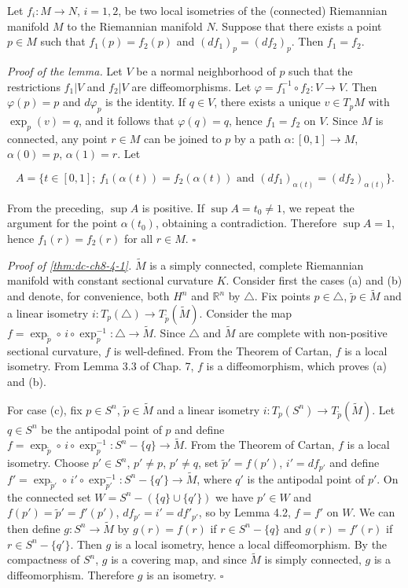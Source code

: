 \begin{lemma}
  \label{lem:dc-ch8-4-2}
  \notready
  Let $f_i:M\to N$, $i=1,2$, be two local isometries of the (connected) Riemannian
  manifold $M$ to the Riemannian manifold $N$. Suppose that there exists a point
  $p\in M$ such that $f_1(p)=f_2(p)$ and $(df_1)_p=(df_2)_p$. Then $f_1=f_2$.
  
  \emph{Proof of the lemma.} Let $V$ be a normal neighborhood of $p$ such that the
  restrictions $f_1|V$ and $f_2|V$ are diffeomorphisms. Let
  $\varphi=f_1^{-1}\circ f_2:V\to V$. Then $\varphi(p)=p$ and $d\varphi_p$ is the
  identity. If $q\in V$, there exists a unique $v\in T_pM$ with $\exp_p(v)=q$, and it
  follows that $\varphi(q)=q$, hence $f_1=f_2$ on $V$. Since $M$ is connected, any
  point $r\in M$ can be joined to $p$ by a path $\alpha:[0,1]\to M$, $\alpha(0)=p$,
  $\alpha(1)=r$. Let
  
  $$
  A=\{t\in[0,1];\ f_1(\alpha(t))=f_2(\alpha(t))\text{ and }(df_1)_{\alpha(t)}=(df_2)_{\alpha(t)}\}.
  $$
  
  From the preceding, $\sup A$ is positive. If $\sup A=t_0\neq 1$, we repeat the
  argument for the point $\alpha(t_0)$, obtaining a contradiction. Therefore
  $\sup A=1$, hence $f_1(r)=f_2(r)$ for all $r\in M$. $\square$
  
  \emph{Proof of \cref{thm:dc-ch8-4-1}.} $\tilde{M}$ is a simply connected, complete Riemannian
  manifold with constant sectional curvature $K$. Consider first the cases (a) and
  (b) and denote, for convenience, both $H^n$ and $\mathbb{R}^n$ by $\triangle$. Fix
  points $p\in\triangle$, $\tilde{p}\in\tilde{M}$ and a linear isometry
  $i:T_p(\triangle)\to T_{\tilde{p}}(\tilde{M})$. Consider the map
  $f=\exp_{\tilde{p}}\circ\,i\circ\exp_p^{-1}:\triangle\to\tilde{M}$. Since $\triangle$
  and $\tilde{M}$ are complete with non-positive sectional curvature, $f$ is
  well-defined. From the Theorem of Cartan, $f$ is a local isometry. From Lemma 3.3
  of Chap. 7, $f$ is a diffeomorphism, which proves (a) and (b).
  
  For case (c), fix $p\in S^n$, $\tilde{p}\in\tilde{M}$ and a linear isometry
  $i:T_p(S^n)\to T_{\tilde{p}}(\tilde{M})$. Let $q\in S^n$ be the antipodal point of
  $p$ and define $f=\exp_{\tilde{p}}\circ\,i\circ\exp_p^{-1}:S^n-\{q\}\to\tilde{M}$.
  From the Theorem of Cartan, $f$ is a local isometry. Choose $p'\in S^n$,
  $p'\neq p$, $p'\neq q$, set $\tilde{p}'=f(p')$, $i'=df_{p'}$ and define
  $f'=\exp_{\tilde{p}'}\circ\,i'\circ\exp_{p'}^{-1}:S^n-\{q'\}\to\tilde{M}$, where
  $q'$ is the antipodal point of $p'$. On the connected set
  $W=S^n-(\{q\}\cup\{q'\})$ we have $p'\in W$ and $f(p')=\tilde{p}'=f'(p')$,
  $df_{p'}=i'=df'_{p'}$, so by Lemma 4.2, $f=f'$ on $W$. We can then define
  $g:S^n\to\tilde{M}$ by $g(r)=f(r)$ if $r\in S^n-\{q\}$ and $g(r)=f'(r)$ if
  $r\in S^n-\{q'\}$. Then $g$ is a local isometry, hence a local diffeomorphism. By
  the compactness of $S^n$, $g$ is a covering map, and since $\tilde{M}$ is simply
  connected, $g$ is a diffeomorphism. Therefore $g$ is an isometry. $\square$
  

\end{lemma}
